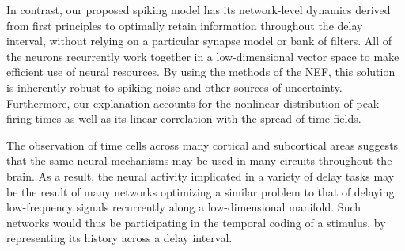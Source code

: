 In contrast, our proposed spiking model has its network-level dynamics derived from first principles to optimally retain information throughout the delay interval, without relying on a particular synapse model or bank of filters.
All of the neurons recurrently work together in a low-dimensional vector space to make efficient use of neural resources.
By using the methods of the NEF, this solution is inherently robust to spiking noise and other sources of uncertainty.
Furthermore, our explanation accounts for the nonlinear distribution of peak firing times as well as its linear correlation with the spread of time fields.

The observation of time cells across many cortical and subcortical areas suggests that the same neural mechanisms may be used in many circuits throughout the brain.
As a result, the neural activity implicated in a variety of delay tasks may be the result of many networks optimizing a similar problem to that of delaying low-frequency signals recurrently along a low-dimensional manifold.
Such networks would thus be participating in the temporal coding of a stimulus, by representing its history across a delay interval.

